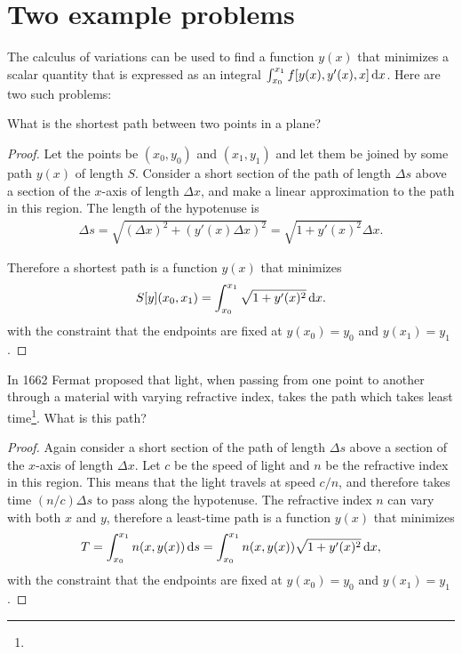 
\section{Two example problems}
The calculus of variations can be used to find a function $y(x)$ that minimizes a scalar quantity
that is expressed as an integral $\int_{x_0}^{x_1} f[y(x), y'(x), x] \dx$. Here are two such
problems:

\begin{question*}
  What is the shortest path between two points in a plane?
\end{question*}

\begin{proof}
  Let the points be $(x_0, y_0)$ and $(x_1, y_1)$ and let them be joined by some path $y(x)$ of
  length $S$. Consider a short section of the path of length $\Delta s$ above a section of the
  $x$-axis of length $\Delta x$, and make a linear approximation to the path in this region. The
  length of the hypotenuse is
  \begin{align*}
    \Delta s = \sqrt{(\Delta x)^2 + (y'(x)\Delta x)^2} = \sqrt{1 + y'(x)^2} \Delta x.
  \end{align*}

  Therefore a shortest path is a function $y(x)$ that minimizes
  \begin{align*}
    S[y](x_0, x_1) = \int_{x_0}^{x_1} \sqrt{1 + y'(x)^2}\d x.
  \end{align*}
  with the constraint that the endpoints are fixed at $y(x_0) = y_0$ and $y(x_1) = y_1$.

\end{proof}


\begin{question*}
  In 1662 Fermat proposed that light, when passing from one point to another through a material with
  varying refractive index, takes the path which takes least time\footnote{}. What
  is this path?
\end{question*}

\begin{proof}
  Again consider a short section of the path of length $\Delta s$ above a section of the $x$-axis of
  length $\Delta x$. Let $c$ be the speed of light and $n$ be the refractive index in this
  region. This means that the light travels at speed $c/n$, and therefore takes time $(n/c)\Delta s$
  to pass along the hypotenuse. The refractive index $n$ can vary with both $x$ and $y$, therefore a
  least-time path is a function $y(x)$ that minimizes
  \begin{align*}
    T = \int_{x_0}^{x_1} n(x, y(x)) \d s = \int_{x_0}^{x_1} n(x, y(x)) \sqrt{1 + y'(x)^2} \dx,
  \end{align*}
  with the constraint that the endpoints are fixed at $y(x_0) = y_0$ and $y(x_1) = y_1$.

\end{proof}

